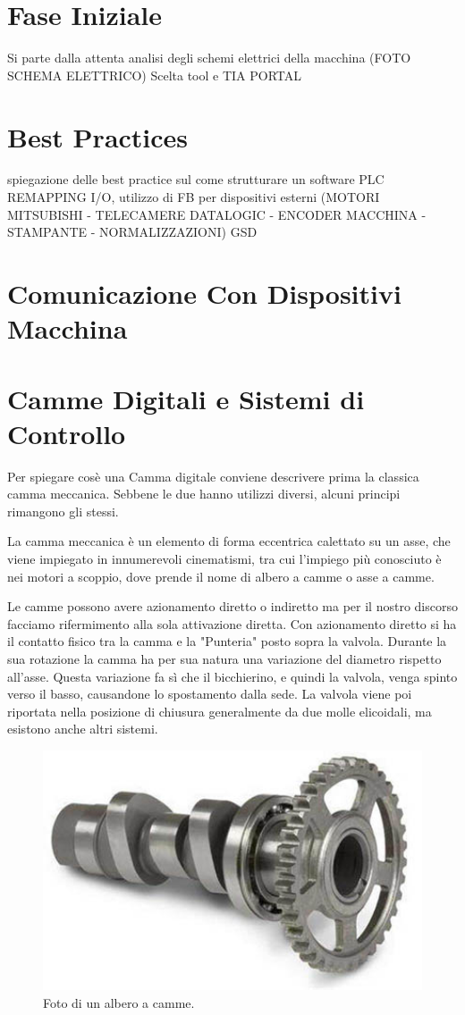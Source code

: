 \documentclass[12pt, a4paper, oneside]{book}
\begin{document}
\section{Fase Iniziale }
Si parte dalla attenta analisi degli schemi elettrici della macchina (FOTO SCHEMA ELETTRICO)
Scelta tool e TIA PORTAL

\section{Best Practices}
spiegazione delle best practice sul come strutturare un software PLC REMAPPING I/O, utilizzo di FB per dispositivi esterni (MOTORI MITSUBISHI - TELECAMERE DATALOGIC - ENCODER MACCHINA - STAMPANTE - NORMALIZZAZIONI) GSD
\section{Comunicazione Con Dispositivi Macchina}

\section{Camme Digitali e Sistemi di Controllo}
Per spiegare cosè una Camma digitale conviene descrivere prima la classica camma meccanica. Sebbene le due hanno utilizzi diversi, alcuni principi rimangono gli stessi.

La camma meccanica è un elemento di forma eccentrica calettato su un asse, che viene impiegato in innumerevoli cinematismi, tra cui l'impiego più conosciuto è nei motori a scoppio, dove prende il nome di albero a camme o asse a camme.

Le camme possono avere azionamento diretto o indiretto ma per il nostro discorso facciamo rifermimento alla sola attivazione diretta.
Con azionamento diretto si ha il contatto fisico tra la camma e la "Punteria" posto sopra la valvola. Durante la sua rotazione la camma ha per sua natura una variazione del diametro rispetto all'asse. Questa variazione fa sì che il bicchierino, e quindi la valvola, venga spinto verso il basso, causandone lo spostamento dalla sede. La valvola viene poi riportata nella posizione di chiusura generalmente da due molle elicoidali, ma esistono anche altri sistemi.

\begin{figure}[H]
	\centering
	\includegraphics[width=12cm]{Immagini/camme}
	\caption{ Foto di un albero a camme.}
\end{figure}
\end{document}
